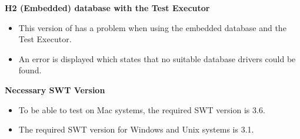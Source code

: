 
\textbf{H2 (Embedded) database with the Test Executor}\\
\begin{itemize}
\item This version of \app{} has a problem when using the embedded database and the Test Executor. 
\item An error is displayed which states that no suitable database drivers could be found. 
\end{itemize}


\textbf{Necessary SWT Version}\\
\begin{itemize}
\item To be able to test \gdauts{} on Mac systems, the required SWT version is 3.6. 
\item The required SWT version for Windows and Unix systems is 3.1.
\end{itemize}
